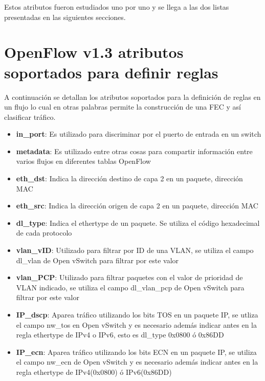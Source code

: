 Estos atributos fueron estudiados uno por uno y se llega a las dos listas presentadas en las siguientes secciones.

\section{OpenFlow v1.3 atributos soportados para definir reglas}

A continuaci\'on se detallan los atributos soportados para la definici\'on de reglas en un flujo lo cual en otras palabras permite la construcci\'on de una FEC y así clasificar tr\'afico.

\begin{itemize}

\item \textbf{in\_port}: Es utilizado para discriminar por el puerto de entrada en un switch

\item \textbf{metadata}: Es utilizado entre otras cosas para compartir informaci\'on entre varios flujos en diferentes tablas OpenFlow

\item \textbf{eth\_dst}: Indica la direcci\'on destino de capa 2 en un paquete, direcci\'on MAC

\item \textbf{eth\_src}: Indica la direcci\'on origen de capa 2 en un paquete, direcci\'on MAC

\item \textbf{dl\_type}: Indica el ethertype de un paquete. Se utiliza el c\'odigo hexadecimal de cada protocolo

\item \textbf{vlan\_vID}: Utilizado para filtrar por ID de una VLAN, se utiliza el campo dl\_vlan de Open vSwitch para filtrar por este valor

\item \textbf{vlan\_PCP}: Utilizado para filtrar paquetes con el valor de prioridad de VLAN indicado, se utiliza el campo dl\_vlan\_pcp de Open vSwitch para filtrar por este valor

\item \textbf{IP\_dscp}: Aparea tr\'afico utilizando los bits TOS en un paquete IP, se utliza el campo nw\_tos en Open vSwitch y es necesario adem\'as indicar antes en la regla ethertype de IPv4 o IPv6, esto es dl\_type 0x0800 \'o 0x86DD

\item \textbf{IP\_ecn}: Aparea tr\'afico utilizando los bits ECN en un paquete IP, se utiliza el campo nw\_ecn de Open vSwitch y es necesario adem\'as indicar antes en la regla ethertype de IPv4(0x0800) \'o IPv6(0x86DD)


\end{itemize}
